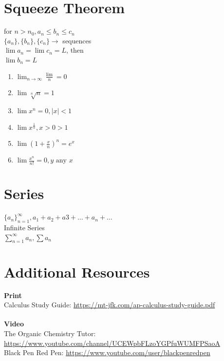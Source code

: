 \documentclass[12pt, letterpaper]{article}
\begin{document}
\section{Squeeze Theorem}
for $n>n_0, a_n \leq b_n \leq c_n$\\
$\lbrace a_n \rbrace, \lbrace b_n \rbrace, \lbrace c_n \rbrace \rightarrow$ sequences\\
$\lim a_n = \lim c_n = L$, then\\
$\lim b_n = L$\\
\begin{enumerate}
  \item $\lim _{n \to \infty} \frac{\lim}{n}=0$
  \item $\lim \sqrt[n]{n} = 1$
  \item $\lim x^n = 0, |x|<1$
  \item $\lim x^{\frac{1}{n}}, x>0>1$
  \item $\lim (1 + \frac{x}{n})^n = e^x$
  \item $\lim \frac{x^n}{n!} = 0, y \text{ any } x$
\end{enumerate}

\section{Series}
$\lbrace a_n \rbrace _{n=1}^{\infty}, a_1+a_2+a3+\dots+a_n+\dots$\\
Infinite Series\\
$\sum _{n=1}^{\infty} a_n, \sum a_n$

\pagebreak

\section{Additional Resources}
\textbf{Print}\\
Calculus Study Guide: \url{https://mt-jfk.com/ap-calculus-study-guide.pdf}\\
\\
\textbf{Video}\\
The Organic Chemistry Tutor: \url{https://www.youtube.com/channel/UCEWpbFLzoYGPfuWUMFPSaoA}\\
Black Pen Red Pen: \url{https://www.youtube.com/user/blackpenredpen}
\end{document}

